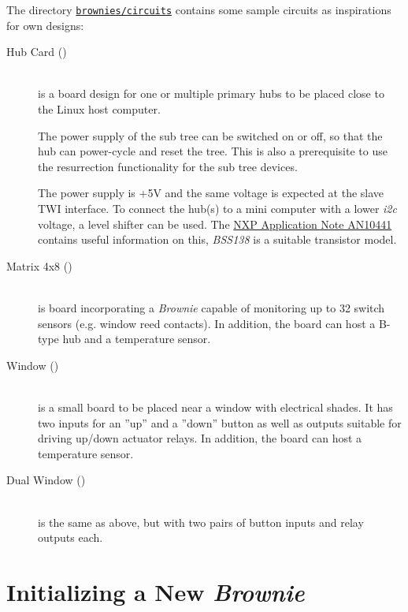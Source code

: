 \documentclass[12pt,english,parskip=half,headheight=19pt]{scrreprt}
\newcommand{\refsrc}[1]{\href{#1}{\texttt{#1}}}     %
\begin{document}
The directory \refsrc{brownies/circuits} contains some sample circuits as inspirations for own designs:
\begin{description}
  \item[Hub Card ()] ~ \\
    is a board design for one or multiple primary hubs to be placed close to the Linux host computer.

    The power supply of the sub tree can be switched on or off, so that the hub can power-cycle and
    reset the tree. This is also a prerequisite to use the resurrection functionality for the sub tree
    devices.

    The power supply is +5V and the same voltage is expected at the slave TWI interface. To connect
    the hub(s) to a mini computer with a lower \textit{i2c} voltage, a level shifter can be used.
    The \href{https://www.nxp.com/docs/en/application-note/AN10441.pdf}{NXP Application Note AN10441}
    contains useful information on this, \textit{BSS138} is a suitable transistor model.

  \item[Matrix 4x8 ()] ~ \\
    is board incorporating a \textit{Brownie} capable of monitoring up to 32 switch sensors
    (e.g. window reed contacts). In addition, the board can host a B-type hub and a temperature
    sensor.

  \item[Window ()] ~ \\
    is a small board to be placed near a window with electrical shades. 
    It has two inputs for an ''up'' and a ''down'' button as well as outputs suitable for driving up/down actuator relays. 
    In addition, the board can host a temperature sensor.

  \item[Dual Window ()] ~ \\
    is the same as above, but with two pairs of button inputs and relay outputs each.

\end{description}





\section{Initializing a New \textit{Brownie}}
\label{sec:brownies-init}
\end{document}
